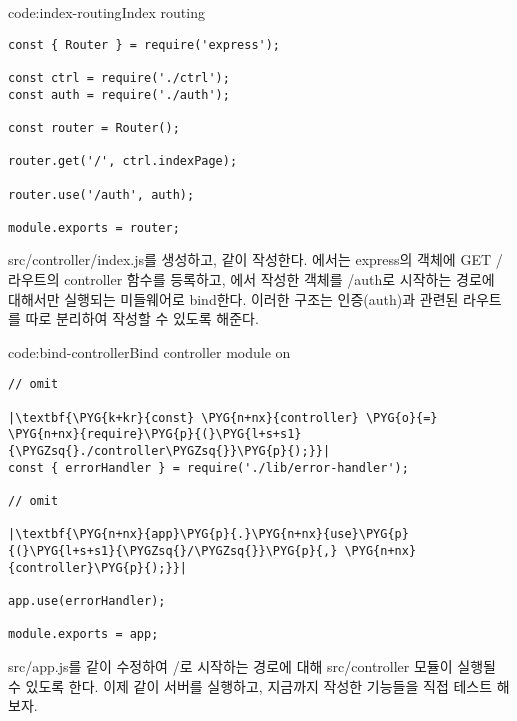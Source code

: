 \begin{code}{code:index-routing}{Index routing}
\begin{verbatim}
const { Router } = require('express');

const ctrl = require('./ctrl');
const auth = require('./auth');

const router = Router();

router.get('/', ctrl.indexPage);

router.use('/auth', auth);

module.exports = router;
\end{verbatim}
\end{code}

src/controller/index.js를 생성하고, \과 같이 작성한다. 에서는 express의  객체에 GET / 라우트의 controller 함수를 등록하고, 에서 작성한  객체를 /auth로 시작하는 경로에 대해서만 실행되는 미들웨어로 bind한다. 이러한 구조는 인증(auth)과 관련된 라우트를 따로 분리하여 작성할 수 있도록 해준다.

\begin{code}{code:bind-controller}{Bind controller module on }
\begin{verbatim}
// omit

|\textbf{\PYG{k+kr}{const} \PYG{n+nx}{controller} \PYG{o}{=} \PYG{n+nx}{require}\PYG{p}{(}\PYG{l+s+s1}{\PYGZsq{}./controller\PYGZsq{}}\PYG{p}{);}}|
const { errorHandler } = require('./lib/error-handler');

// omit

|\textbf{\PYG{n+nx}{app}\PYG{p}{.}\PYG{n+nx}{use}\PYG{p}{(}\PYG{l+s+s1}{\PYGZsq{}/\PYGZsq{}}\PYG{p}{,} \PYG{n+nx}{controller}\PYG{p}{);}}|

app.use(errorHandler);

module.exports = app;
\end{verbatim}
\end{code}







src/app.js를 \와 같이 수정하여 /로 시작하는 경로에 대해 src/controller 모듈이 실행될 수 있도록 한다. 이제 \와 같이 서버를 실행하고, 지금까지 작성한 기능들을 직접 테스트 해보자.

